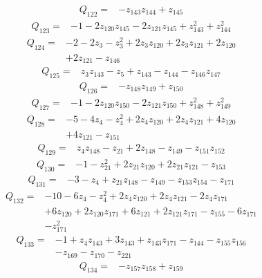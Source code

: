\[\begin{aligned}Q_{122}={}&-z_{143}z_{144}+z_{145}
\end{aligned}\]
\[\begin{aligned}Q_{123}={}&-1-2z_{120}z_{145}-2z_{121}z_{145}+z_{143}^{2}+z_{144}^{2}
\end{aligned}\]
\[\begin{aligned}Q_{124}={}&-2-2z_{3}-z_{3}^{2}+2z_{3}z_{120}+2z_{3}z_{121}+2z_{120}
\\&+2z_{121}-z_{146}
\end{aligned}\]
\[\begin{aligned}Q_{125}={}&z_{3}z_{143}-z_{5}+z_{143}-z_{144}-z_{146}z_{147}
\end{aligned}\]
\[\begin{aligned}Q_{126}={}&-z_{148}z_{149}+z_{150}
\end{aligned}\]
\[\begin{aligned}Q_{127}={}&-1-2z_{120}z_{150}-2z_{121}z_{150}+z_{148}^{2}+z_{149}^{2}
\end{aligned}\]
\[\begin{aligned}Q_{128}={}&-5-4z_{4}-z_{4}^{2}+2z_{4}z_{120}+2z_{4}z_{121}+4z_{120}
\\&+4z_{121}-z_{151}
\end{aligned}\]
\[\begin{aligned}Q_{129}={}&z_{4}z_{148}-z_{21}+2z_{148}-z_{149}-z_{151}z_{152}
\end{aligned}\]
\[\begin{aligned}Q_{130}={}&-1-z_{21}^{2}+2z_{21}z_{120}+2z_{21}z_{121}-z_{153}
\end{aligned}\]
\[\begin{aligned}Q_{131}={}&-3-z_{4}+z_{21}z_{148}-z_{149}-z_{153}z_{154}-z_{171}
\end{aligned}\]
\[\begin{aligned}Q_{132}={}&-10-6z_{4}-z_{4}^{2}+2z_{4}z_{120}+2z_{4}z_{121}-2z_{4}z_{171}
\\&+6z_{120}+2z_{120}z_{171}+6z_{121}+2z_{121}z_{171}-z_{155}-6z_{171}
\\&-z_{171}^{2}
\end{aligned}\]
\[\begin{aligned}Q_{133}={}&-1+z_{4}z_{143}+3z_{143}+z_{143}z_{171}-z_{144}-z_{155}z_{156}
\\&-z_{169}-z_{170}-z_{221}
\end{aligned}\]
\[\begin{aligned}Q_{134}={}&-z_{157}z_{158}+z_{159}
\end{aligned}\]
